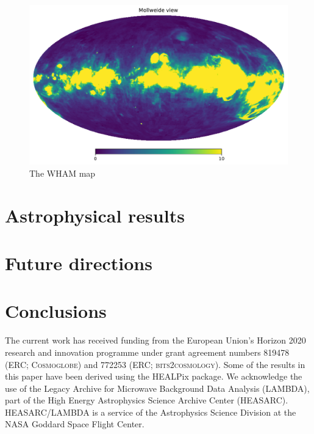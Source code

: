 \documentclass{aa}
\begin{document}
\begin{figure}
  \centering
  \includegraphics[width=\columnwidth]{figures/wham.pdf}
  \caption{The WHAM map}
  \label{fig:wham}
\end{figure}




\clearpage
\section{Astrophysical results}


\clearpage
\section{Future directions}

\clearpage
\section{Conclusions}




\blindtext





\begin{acknowledgements}
 The current work has received funding from the European
  Union’s Horizon 2020 research and innovation programme under grant
  agreement numbers 819478 (ERC; \textsc{Cosmoglobe}) and 772253 (ERC;
  \textsc{bits2cosmology}). Some of the results in this paper have been derived using the HEALPix \citep{HEALPIX} package.
  We acknowledge the use of the Legacy Archive for Microwave Background Data
  Analysis (LAMBDA), part of the High Energy Astrophysics Science Archive Center
  (HEASARC). HEASARC/LAMBDA is a service of the Astrophysics Science Division at
  the NASA Goddard Space Flight Center.  
\end{acknowledgements}


%



\end{document}
